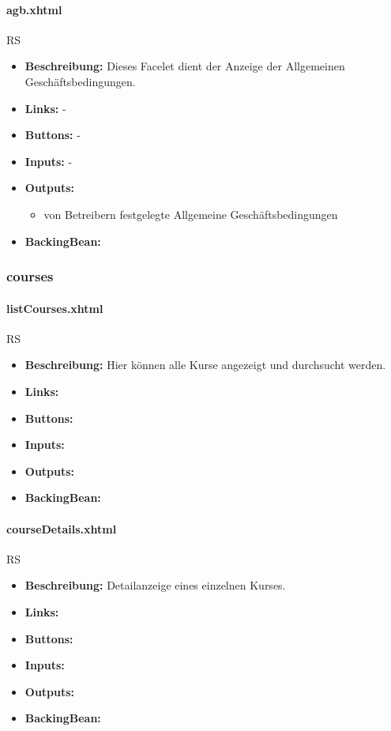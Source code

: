				\paragraph{agb.xhtml}
					RS\\
					\begin{itemize}
						\item \textbf{Beschreibung:} Dieses Facelet dient der Anzeige der Allgemeinen Geschäftsbedingungen.
						\item \textbf{Links:} -
						\item \textbf{Buttons:} -
						\item \textbf{Inputs:} -
						\item \textbf{Outputs:}
							\begin{itemize}
								\item von Betreibern festgelegte Allgemeine Geschäftsbedingungen
							\end{itemize}
						\item \textbf{BackingBean:}
					\end{itemize}
		
			\subsubsection{courses}
				
				\paragraph{listCourses.xhtml}
					RS\\
					\begin{itemize}
						\item \textbf{Beschreibung:} Hier können alle Kurse angezeigt und durchsucht werden.
						\item \textbf{Links:}
						\item \textbf{Buttons:}
						\item \textbf{Inputs:}
						\item \textbf{Outputs:}
						\item \textbf{BackingBean:}
					\end{itemize}
				
				\paragraph{courseDetails.xhtml}
					RS\\
					\begin{itemize}
						\item \textbf{Beschreibung:} Detailanzeige eines einzelnen Kurses.
						\item \textbf{Links:}
						\item \textbf{Buttons:}
						\item \textbf{Inputs:}
						\item \textbf{Outputs:}
						\item \textbf{BackingBean:}
					\end{itemize}
		
